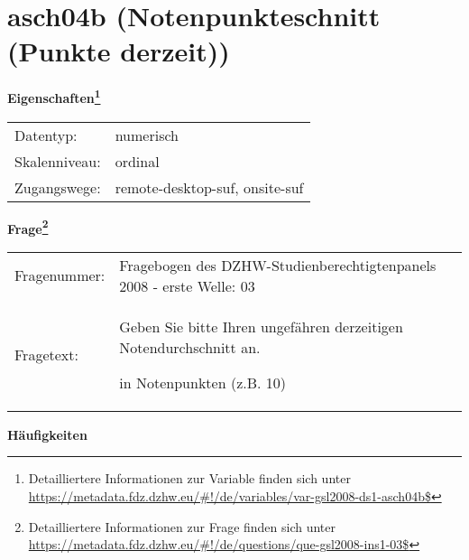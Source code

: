 
    \setcounter{footnote}{0}

    \vspace*{-1.8cm}
	\section{asch04b (Notenpunkteschnitt (Punkte derzeit))}
	\label{section:asch04b}



    \vspace*{0.5cm}
    \noindent\textbf{Eigenschaften\footnote{Detailliertere Informationen zur Variable finden sich unter
		\url{https://metadata.fdz.dzhw.eu/\#!/de/variables/var-gsl2008-ds1-asch04b$}}}\\
	\begin{tabularx}{\hsize}{@{}lX}
	Datentyp: & numerisch \\
	Skalenniveau: & ordinal \\
	Zugangswege: &
	  remote-desktop-suf, 
	  onsite-suf
 \\
    \end{tabularx}



				\vspace*{0.5cm}
                \noindent\textbf{Frage\footnote{Detailliertere Informationen zur Frage finden sich unter
		              \url{https://metadata.fdz.dzhw.eu/\#!/de/questions/que-gsl2008-ins1-03$}}}\\
				\begin{tabularx}{\hsize}{@{}lX}
					Fragenummer: &
					  Fragebogen des DZHW-Studienberechtigtenpanels 2008 - erste Welle:
					  03
 \\
					Fragetext: & Geben Sie bitte Ihren ungefähren derzeitigen Notendurchschnitt an.\par  in Notenpunkten (z.B. 10) \\
				\end{tabularx}





        		\vspace*{0.5cm}
                \noindent\textbf{Häufigkeiten}

